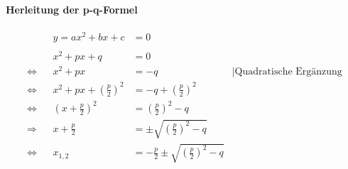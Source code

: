 \paragraph{Herleitung der p-q-Formel}

\begin{align*}
    && y = a x^2 + b x +c &= 0 \\
    \\
    && x^2 + px + q &= 0 \\
    \Leftrightarrow&& x^2 + px &= -q &\mid \text{Quadratische Ergänzung} \\
    \Leftrightarrow&& x^2 + px + {\left(\frac{p}{2}\right)}^2 &= -q + {\left(\frac{p}{2}\right)}^2 \\
    \Leftrightarrow&& {\left( x+\frac{p}{2} \right)}^2 &= {\left(\frac{p}{2}\right)}^2 - q \\
    \Rightarrow&& x + \frac{p}{2} &= \pm \sqrt{{\left(\frac{p}{2}\right)}^2 - q} \\
    \Leftrightarrow&& x_{1,2} &= -\frac{p}{2} \pm \sqrt{{\left(\frac{p}{2}\right)}^2 - q}
\end{align*}

